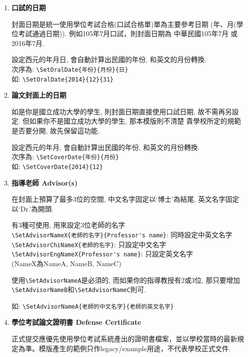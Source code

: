 \begin{enumerate}
  \item
  {
    \textbf{口試的日期}

    封面日期是統一使用學位考試合格(口試合格單)單為主要參考日期 (年、月(學位考試通過日期)). 例如105年7月口試，則封面日期為 中華民國105年7月 或 2016年7月.

    設定西元的年月日, 會自動計算出民國的年份, 和英文的月份轉換.\\
    次序為: \verb|\SetOralDate{年份}{月份}{日}|\\
    如: \verb|\SetOralDate{2014}{12}{31}|
  } %

  \item
  {
    \textbf{論文封面上的日期}

    如是你是國立成功大學的學生, 則封面日期直接使用口試日期, 故不需再另設定. 但如果你不是國立成功大學的學生, 那本模版則不清楚 貴學校所定的規範是否要分開, 故先保留這功能.

    設定西元的年月, 會自動計算出民國的年份, 和英文的月份轉換.\\
    次序為: \verb|\SetCoverDate{年份}{月份}|\\
    如: \verb|\SetCoverDate{2014}{12}|
  } %

  \item
  {
    \textbf{指導老師 Advisor(s)}

    在封面上預算了最多3位的空間, 中文名字固定以`博士'為結尾, 英文名字固定以`Dr.'為開頭.

    有3種可使用, 用來設定3位老師的名字\\
    \verb|\SetAdvisorNameX{老師的名字}{Professor's name}|: 同時設定中英文名字\\
    \verb|\SetAdvisorChiNameX{老師的名字}|: 只設定中文名字\\
    \verb|\SetAdvisorEngNameX{Professor's name}|: 只設定英文名字\\
    (NameX為NameA, NameB, NameC)

    使用\verb|\SetAdvisorNameA|是必須的, 而如果你的指導教授有2或3位, 那只要增加\verb|\SetAdvisorNameB|和\verb|\SetAdvisorNameC|則可.

    如: \verb|\SetAdvisorNameA{老師的中文名字}{老師的英文名字}|
  } %

  \item
  {
    \textbf{學位考試論文證明書 Defense Certificate}

    正式提交應優先使用學位考試系統產出的證明書檔案，並以學校當時的最新規定為準。模版產生的範例只作legacy/example用途，不代表學校正式文件.

}
\end{enumerate}
